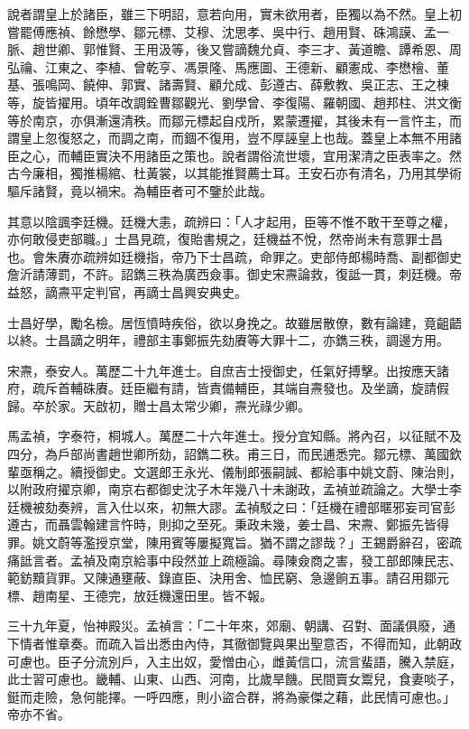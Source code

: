 \begin{pinyinscope}
說者謂皇上於諸臣，雖三下明詔，意若向用，實未欲用者，臣獨以為不然。皇上初嘗罷傅應禎、餘懋學、鄒元標、艾穆、沈思孝、吳中行、趙用賢、硃鴻謨、孟一脈、趙世卿、郭惟賢、王用汲等，後又嘗謫魏允貞、李三才、黃道瞻、譚希恩、周弘禴、江東之、李植、曾乾亨、馮景隆、馬應圖、王德新、顧憲成、李懋檜、董基、張鳴岡、饒伸、郭實、諸壽賢、顧允成、彭遵古、薛敷教、吳正志、王之棟等，旋皆擢用。頃年改調銓曹鄒觀光、劉學曾、李復陽、羅朝國、趙邦柱、洪文衡等於南京，亦俱漸還清秩。而鄒元標起自戍所，累蒙遷擢，其後未有一言忤主，而謂皇上忽復怒之，而調之南，而錮不復用，豈不厚誣皇上也哉。蓋皇上本無不用諸臣之心，而輔臣實決不用諸臣之策也。說者謂俗流世壞，宜用潔清之臣表率之。然古今廉相，獨推楊綰、杜黃裳，以其能推賢薦士耳。王安石亦有清名，乃用其學術驅斥諸賢，竟以禍宋。為輔臣者可不鑒於此哉。

其意以陰諷李廷機。廷機大恚，疏辨曰：「人才起用，臣等不惟不敢干至尊之權，亦何敢侵吏部職。」士昌見疏，復貽書規之，廷機益不悅，然帝尚未有意罪士昌也。會朱賡亦疏辨如廷機指，帝乃下士昌疏，命罪之。吏部侍郎楊時喬、副都御史詹沂請薄罰，不許。詔鐫三秩為廣西僉事。御史宋燾論救，復詆一貫，刺廷機。帝益怒，謫燾平定判官，再謫士昌興安典史。

士昌好學，勵名檢。居恆憤時疾俗，欲以身挽之。故雖居散僚，數有論建，竟齟齬以終。士昌謫之明年，禮部主事鄭振先劾賡等大罪十二，亦鐫三秩，調邊方用。

宋燾，泰安人。萬歷二十九年進士。自庶吉士授御史，任氣好搏擊。出按應天諸府，疏斥首輔硃賡。廷臣繼有請，皆責備輔臣，其端自燾發也。及坐謫，旋請假歸。卒於家。天啟初，贈士昌太常少卿，燾光祿少卿。

馬孟禎，字泰符，桐城人。萬歷二十六年進士。授分宜知縣。將內召，以征賦不及四分，為戶部尚書趙世卿所劾，詔鐫二秩。甫三日，而民逋悉完。鄒元標、萬國欽輩亟稱之。續授御史。文選郎王永光、儀制郎張嗣誠、都給事中姚文蔚、陳治則，以附政府擢京卿，南京右都御史沈子木年幾八十未謝政，孟禎並疏論之。大學士李廷機被劾奏辨，言入仕以來，初無大謬。孟禎駁之曰：「廷機在禮部暱邪妄司官彭遵古，而聶雲翰建言忤時，則抑之至死。秉政未幾，姜士昌、宋燾、鄭振先皆得罪。姚文蔚等濫授京堂，陳用賓等屢擬寬旨。猶不謂之謬哉？」王錫爵辭召，密疏痛詆言者。孟禎及南京給事中段然並上疏極論。尋陳僉商之害，發工部郎陳民志、範鈁黷貨罪。又陳通壅蔽、錄直臣、決用舍、恤民窮、急邊餉五事。請召用鄒元標、趙南星、王德完，放廷機還田里。皆不報。

三十九年夏，怡神殿災。孟禎言：「二十年來，郊廟、朝講、召對、面議俱廢，通下情者惟章奏。而疏入旨出悉由內侍，其徹御覽與果出聖意否，不得而知，此朝政可慮也。臣子分流別戶，入主出奴，愛憎由心，雌黃信口，流言蜚語，騰入禁庭，此士習可慮也。畿輔、山東、山西、河南，比歲旱饑。民間賣女鬻兒，食妻啖子，鋌而走險，急何能擇。一呼四應，則小盜合群，將為豪傑之藉，此民情可慮也。」帝亦不省。


\end{pinyinscope}
